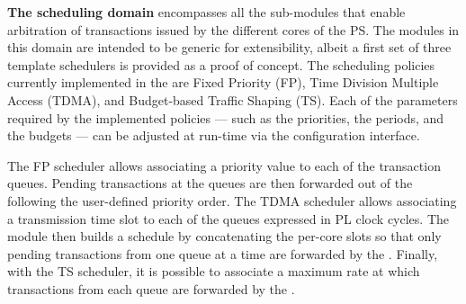 \par{\bf The scheduling domain} encompasses all the sub-modules that
enable arbitration of transactions issued by the different cores of
the PS. The modules in this domain are intended to be generic for
extensibility, albeit a first set of three template schedulers is
provided as a proof of concept.  The scheduling policies currently
implemented in the \schim are Fixed Priority (FP), Time Division
Multiple Access (TDMA), and Budget-based Traffic Shaping (TS).  Each
of the parameters required by the implemented policies --- such as the
priorities, the periods, and the budgets --- can be adjusted at
run-time via the configuration interface.

The FP scheduler allows associating a priority value to each of the
transaction queues. Pending transactions at the queues are then
forwarded out of the \schim following the user-defined priority
order. The TDMA scheduler allows associating a transmission time slot
to each of the queues expressed in PL clock cycles. The module then
builds a schedule by concatenating the per-core slots so that only
pending transactions from one queue at a time are forwarded by the
\schim. Finally, with the TS scheduler, it is possible to associate a
maximum rate at which transactions from each queue are forwarded by
the \schim. 




